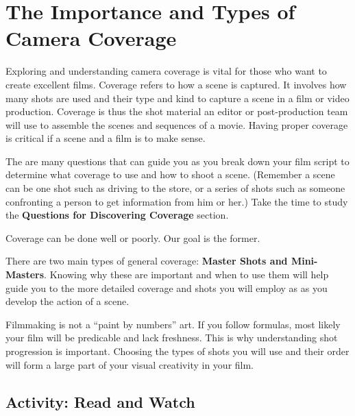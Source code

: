 \documentclass[
  letterpaper,
  DIV=11,
  numbers=noendperiod]{scrreprt}
\begin{document}
\section{The Importance and Types of Camera
Coverage}\label{the-importance-and-types-of-camera-coverage}

Exploring and understanding camera coverage is vital for those who want
to create excellent films. Coverage refers to how a scene is captured.
It involves how many shots are used and their type and kind to capture a
scene in a film or video production. Coverage is thus the shot material
an editor or post-production team will use to assemble the scenes and
sequences of a movie. Having proper coverage is critical if a scene and
a film is to make sense.

The are many questions that can guide you as you break down your film
script to determine what coverage to use and how to shoot a scene.
(Remember a scene can be one shot such as driving to the store, or a
series of shots such as someone confronting a person to get information
from him or her.) Take the time to study the \textbf{Questions for
Discovering Coverage} section.

Coverage can be done well or poorly. Our goal is the former.

There are two main types of general coverage: \textbf{Master Shots and
Mini-Masters}. Knowing why these are important and when to use them will
help guide you to the more detailed coverage and shots you will employ
as as you develop the action of a scene.

Filmmaking is not a ``paint by numbers'' art. If you follow formulas,
most likely your film will be predicable and lack freshness. This is why
understanding shot progression is important. Choosing the types of shots
you will use and their order will form a large part of your visual
creativity in your film.

\subsection{Activity: Read and Watch}\label{activity-read-and-watch}
\end{document}
